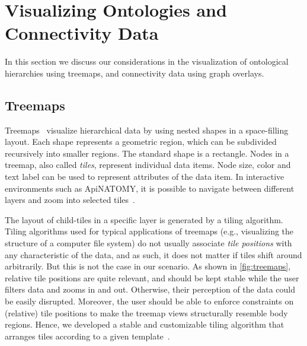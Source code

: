 \section{Visualizing Ontologies and Connectivity Data} \label{sect:visualization}        %

In this section we discuss our considerations in the visualization of ontological
hierarchies using treemaps, and connectivity data using graph overlays.

\subsection{Treemaps} %

Treemaps~\cite{JS91} visualize hierarchical data by using nested shapes in a space-filling layout.
Each shape represents a geometric region, which can be subdivided recursively into smaller regions.
The standard shape is a rectangle. Nodes in a treemap, also called \emph{tiles}, represent individual
data items. Node size, color and text label can be used to represent attributes of the data item.
In interactive environments such as ApiNATOMY, it is possible to navigate between different
layers and zoom into selected tiles~\cite{BL07}.

The layout of child-tiles in a specific layer is generated by a tiling algorithm.
Tiling algorithms used for typical applications of treemaps (e.g., visualizing the structure of a
computer file system) do not usually associate \emph{tile positions} with any characteristic of
the data, and as such, it does not matter if tiles shift around arbitrarily. But this is not the
case in our scenario. As shown in \cref{fig:treemaps}, relative tile positions are quite relevant,
and should be kept stable while the user filters data and zooms in and out. Otherwise, their
perception of the data could be easily disrupted. Moreover, the user should be able to enforce
constraints on (relative) tile positions to make the treemap views structurally resemble body
regions. Hence, we developed a stable and customizable tiling algorithm that arranges tiles
according to a given template~\cite{KBK14}.

